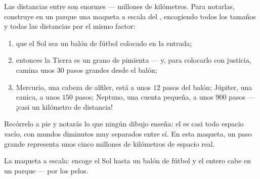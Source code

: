 \begin{method}\label{met:g4:solar-system:model}
Las distancias entre  son enormes --- millones de
kilómetros. Para notarlas, construye en un parque una maqueta a escala
del , encogiendo todos los tamaños y todas las
distancias por el mismo factor:
\begin{enumerate}
  \item que el Sol sea un balón de fútbol colocado en la entrada;
  \item entonces la Tierra es un grano de pimienta --- y, para
        colocarlo con justicia, camina unos $30$ pasos grandes desde
        el balón;
  \item Mercurio, una cabeza de alfiler, está a unos $12$ pasos del
        balón; Júpiter, una canica, a unos $150$ pasos; Neptuno, una
        cuenta pequeña, a unos $900$ pasos --- ¡casi un kilómetro de
        distancia!
\end{enumerate}
Recórrelo a pie y notarás lo que ningún dibujo enseña: el
 es casi todo espacio vacío, con mundos diminutos
muy separados entre sí. En esta maqueta, un paso grande representa
unos cinco millones de kilómetros de espacio real.
\end{method}

\begin{omfigure}

{\small La maqueta a escala: encoge el Sol hasta un balón de fútbol y
el  entero cabe en un parque --- por los pelos.}
\end{omfigure}

